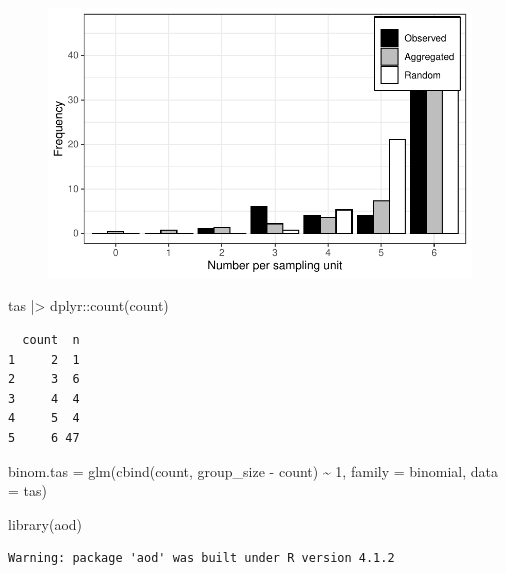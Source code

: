 \documentclass[
  letterpaper,
  DIV=11,
  numbers=noendperiod]{scrreprt}
\newenvironment{Shaded}{\begin{snugshade}}{\end{snugshade}}
\newcommand{\AttributeTok}[1]{\textcolor[rgb]{0.40,0.45,0.13}{#1}}
\newcommand{\DecValTok}[1]{\textcolor[rgb]{0.68,0.00,0.00}{#1}}
\newcommand{\FunctionTok}[1]{\textcolor[rgb]{0.28,0.35,0.67}{#1}}
\newcommand{\NormalTok}[1]{\textcolor[rgb]{0.00,0.23,0.31}{#1}}
\newcommand{\OtherTok}[1]{\textcolor[rgb]{0.00,0.23,0.31}{#1}}
\newcommand{\SpecialCharTok}[1]{\textcolor[rgb]{0.37,0.37,0.37}{#1}}
\begin{document}
\begin{figure}[H]

{\centering \includegraphics{./spatial-tests_files/figure-pdf/unnamed-chunk-100-1.pdf}

}

\end{figure}

\begin{Shaded}
\begin{Highlighting}[]
\NormalTok{tas }\SpecialCharTok{|\textgreater{}}
\NormalTok{  dplyr}\SpecialCharTok{::}\FunctionTok{count}\NormalTok{(count)}
\end{Highlighting}
\end{Shaded}

\begin{verbatim}
  count  n
1     2  1
2     3  6
3     4  4
4     5  4
5     6 47
\end{verbatim}

\begin{Shaded}
\begin{Highlighting}[]
\NormalTok{binom.tas }\OtherTok{=} \FunctionTok{glm}\NormalTok{(}\FunctionTok{cbind}\NormalTok{(count, group\_size }\SpecialCharTok{{-}}\NormalTok{ count) }\SpecialCharTok{\textasciitilde{}} \DecValTok{1}\NormalTok{,}
                \AttributeTok{family =}\NormalTok{ binomial,}
                \AttributeTok{data =}\NormalTok{ tas)}

\FunctionTok{library}\NormalTok{(aod)}
\end{Highlighting}
\end{Shaded}

\begin{verbatim}
Warning: package 'aod' was built under R version 4.1.2
\end{verbatim}
\end{document}
